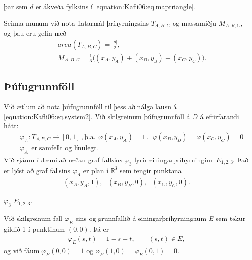 \documentclass[a4paper,10pt,icelandic]{sphinxmanual}
\begin{document}
þar sem \(d\) er ákveða fylksins í \eqref{equation:Kafli06:eq.maptriangle}.

Seinna munum við nota flatarmál þríhyrningsins \(T_{A,B,C}\) og massamiðju \(M_{A,B,C}\), og þau eru gefin með
\begin{equation*}
\begin{split}&& area(T_{A,B,C})= \frac{|d|}{2}, \\
&& M_{A,B,C}=\tfrac 13\big((x_A,y_A)+(x_B,y_B)+(x_C,y_C)\big).\end{split}
\end{equation*}

\subsection{Þúfugrunnföll}
\label{\detokenize{Kafli06:ufugrunnfoll}}
Við ætlum að nota þúfugrunnföll til þess að nálga lausn á \eqref{equation:Kafli06:eq.system2}. Við skilgreinum þúfugrunnföll á \(\bar D\) á eftirfarandi hátt:
\begin{equation*}
\begin{split}&&\varphi_A: T_{A,B,C} \to [0,1] \,, \text{þ.a.}~~
\varphi(x_A,y_A)=1\,, ~~\varphi(x_B,y_B)=\varphi(x_C,y_C)=0 \,
\\
&& \varphi_A ~~\text{er samfellt og línulegt}.\end{split}
\end{equation*}
Við sjáum í dæmi að neðan graf fallsins \(\varphi_3\) fyrir einingarþríhyrninginn \(E_{1,2,3}\).
Það er ljóst að graf fallsins \(\varphi_A\) er plan í \(\mathbb{R}^3\) sem tengir punktana
\begin{equation*}
\begin{split}(x_A,y_A,1), ~~~ (x_B,y_B,0), ~~~ (x_C,y_C,0).\end{split}
\end{equation*}

 \(\varphi_3\)  \(E_{1,2,3}\).

Við skilgreinum fall \(\varphi_E\) eins og grunnfallið á einingarþríhyrningnum \(E\) sem tekur gildið 1 í punktinum \((0,0)\). Þá er
\begin{equation*}
\begin{split}\varphi_E(s,t)=1-s-t, \qquad (s,t)\in E,\end{split}
\end{equation*}
og við fáum \(\varphi_E(0,0)=1\) og \(\varphi_E(1,0)=\varphi_E(0,1)=0\).
\end{document}
